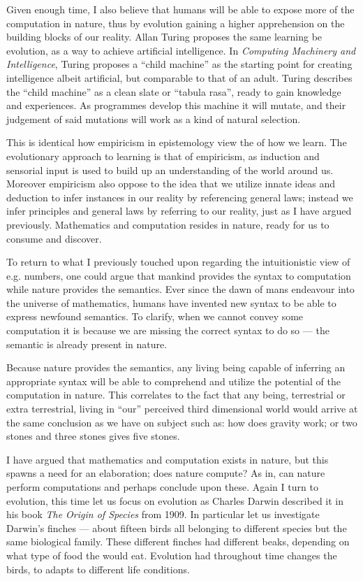\bigskip
Given enough time, I also believe that humans will be able to expose more of the computation in nature, thus by evolution gaining a higher apprehension on the building blocks of our reality.
Allan Turing proposes the same learning be evolution, as a way to achieve artificial intelligence.
In \textit{Computing Machinery and Intelligence}, Turing proposes a \enquote{child machine} as the starting point for creating intelligence albeit artificial, but comparable to that of an adult.
Turing describes the \enquote{child machine} as a clean slate or \enquote{tabula rasa}, ready to gain knowledge and experiences.
As programmes develop this machine it will mutate, and their judgement of said mutations will work as a kind of natural selection.

This is identical how empiricism in epistemology view the of how we learn.
The evolutionary approach to learning is that of empiricism, as induction and sensorial input is used to build up an understanding of the world around us.
Moreover empiricism also oppose to the idea that we utilize innate ideas and deduction to infer instances in our reality by referencing general laws;
instead we infer principles and general laws by referring to our reality, just as I have argued previously.
Mathematics and computation resides in nature, ready for us to consume and discover.

\bigskip
To return to what I previously touched upon regarding the intuitionistic view of e.g. numbers, one could argue that mankind provides the syntax to computation while nature provides the semantics.
Ever since the dawn of mans endeavour into the universe of mathematics, humans have invented new syntax to be able to express newfound semantics.
To clarify, when we cannot convey some computation it is because we are missing the correct syntax to do so --- the semantic is already present in nature.

Because nature provides the semantics, any living being capable of inferring an appropriate syntax will be able to comprehend and utilize the potential of the computation in nature.
This correlates to the fact that any being, terrestrial or extra terrestrial, living in \enquote{our} perceived third dimensional world would arrive at the same conclusion as we have on subject such as: how does gravity work; or two stones and three stones gives five stones.

\bigskip
I have argued that mathematics and computation exists in nature, but this spawns a need for an elaboration; does nature compute?
As in, can nature perform computations and perhaps conclude upon these.
Again I turn to evolution, this time let us focus on evolution as Charles Darwin described it in his book \textit{The Origin of Species} from 1909.
In particular let us investigate Darwin's finches --- about fifteen birds all belonging to different species but the same biological family.
These different finches had different beaks, depending on what type of food the would eat.
Evolution had throughout time changes the birds, to adapts to different life conditions.

